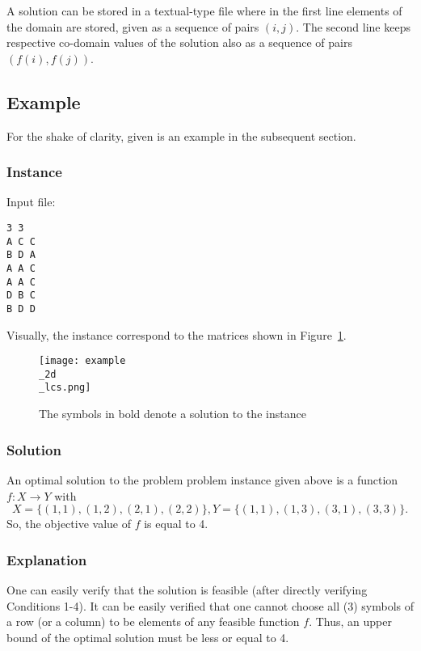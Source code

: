 \documentclass[]{article}
\begin{document}
A solution can be stored in a textual-type file where  in the first line elements of the domain are stored, given as a sequence of pairs $(i, j)$.  The second line keeps respective co-domain values of the solution also as a sequence of pairs $(f(i), f(j))$. 

\subsection{Example}
For the shake of clarity, given is an example in the subsequent section. 

\subsubsection{Instance}

Input file: 
\begin{verbatim}
3 3
A C C
B D A 
A A C
A A C
D B C
B D D
\end{verbatim}
Visually, the instance correspond to the matrices shown in Figure~\ref{fig:instance}. 

\begin{figure}[ht]
	\centering
	\texttt{[image: example\\\_2d\\\_lcs.png]}
	\caption{The symbols in bold denote a solution to the instance\protect\footnotemark }
	\label{fig:instance}
\end{figure}


  

\subsubsection{Solution}

An optimal solution to the problem problem instance given above is a function $f:X \rightarrow Y$ with 
$$X=\{ (1, 1), (1, 2), (2, 1), (2, 2)   \}, Y=\{ (1, 1), (1, 3), (3, 1), (3, 3) \}.$$
So, the objective value of $f$ is equal to 4. 


\subsubsection{Explanation}
 One can easily verify that the solution is feasible (after directly verifying Conditions 1-4). It can be easily verified that one cannot choose all (3) symbols of a row (or a column) to be elements of any feasible function $f$.  Thus, an upper bound of the optimal solution must be less or equal to 4. 
\end{document}
